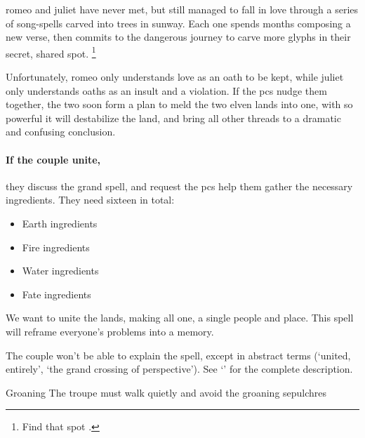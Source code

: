 \begin{multicols}{2}
\noindent
\Gls{romeo} and \gls{juliet} have never met, but still managed to fall in love through a series of song-spells carved into trees in \gls{sunway}.
Each one spends months composing a new verse, then commits to the dangerous journey to carve more glyphs in their secret, shared spot.%
\footnote{Find that spot .}

Unfortunately, \gls{romeo} only understands love as an oath to be kept, while \gls{juliet} only understands oaths as an insult and a violation.
If the \glspl{pc} nudge them together, the two soon form a plan to meld the two elven lands into one, with  so powerful it will destabilize the land, and bring all other threads to a dramatic and confusing conclusion.

\paragraph{If the couple unite,}
they discuss the grand spell, and request the \glspl{pc} help them gather the necessary \glspl{ingredient}.
They need sixteen in total:

%
\null
\begin{itemize}
  \item
   Earth \glspl{ingredient}
  \item
   Fire \glspl{ingredient}
  \item
   Water \glspl{ingredient}
  \item
   Fate \glspl{ingredient}
\end{itemize}

\begin{exampletext}
  We want to unite the lands, making all one, a single people and place.
  This \gls{spell} will reframe everyone's problems into a memory.
\end{exampletext}

The couple won't be able to explain the \gls{spell}, except in abstract terms (`united, entirely', `the grand crossing of perspective').
See `'  for the complete description.

{Groaning }%
{The troupe must walk quietly and avoid the groaning sepulchres}%



\end{multicols}
